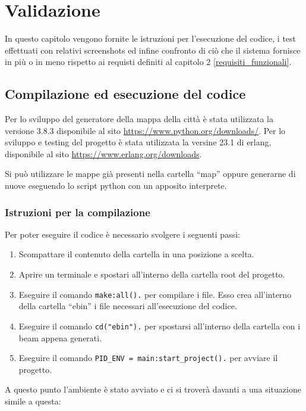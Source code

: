 
\chapter{Validazione}

In questo capitolo vengono fornite le istruzioni per l'esecuzione del codice, i test effettuati con relativi screenshots ed infine confronto di ciò che il sistema fornisce in più o in meno rispetto ai requisti definiti al capitolo 2 \ref{requisiti_funzionali}.

\section{Compilazione ed esecuzione del codice}
Per lo sviluppo del generatore della mappa della città è stata utilizzata la versione 3.8.3 disponibile al sito \url{https://www.python.org/downloads/}.
Per lo sviluppo e testing del progetto è stata utilizzata la versine 23.1 di erlang, disponibile al sito \url{https://www.erlang.org/downloads}.

Si può utilizzare le mappe già presenti nella cartella ``map'' oppure generarne di nuove eseguendo lo script python con un apposito interprete.
\subsection{Istruzioni per la compilazione}\label{istruzioni_compilazione}
Per poter eseguire il codice è necessario svolgere i seguenti passi:
\begin{enumerate}
	\item Scompattare il contenuto della cartella in una posizione a scelta.
	\item Aprire un terminale e spostari all'interno della cartella root del progetto.
	\item Eseguire il comando \lstinline |make:all().| per compilare i file. Esso crea all'interno della cartella ``ebin'' i file necessari all'esecuzione del codice.
	\item Eseguire il comando \lstinline |cd("ebin").| per spostarsi all'interno della cartella con i beam appena generati.
	\item Eseguire il comando \lstinline |PID_ENV = main:start_project().| per avviare il progetto.
\end{enumerate}
A questo punto l'ambiente è stato avviato e ci si troverà davanti a una situazione simile a questa:

